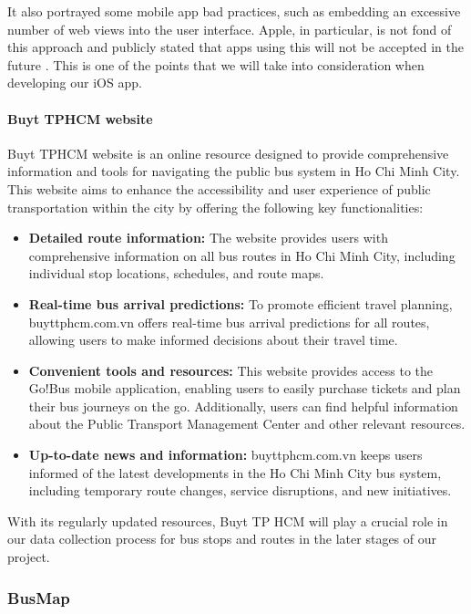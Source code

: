 It also portrayed some mobile app bad practices, such as embedding an excessive number of web views into the user interface. Apple, in particular, is not fond of this approach and publicly stated that apps using this will not be accepted in the future \cite{apple_webview}. This is one of the points that we will take into consideration when developing our iOS app.

\paragraph{Buyt TPHCM website}
Buyt TPHCM website is an online resource designed to provide comprehensive information and tools for navigating the public bus system in Ho Chi Minh City. This website aims to enhance the accessibility and user experience of public transportation within the city by offering the following key functionalities:

\begin{itemize}
    \item \textbf{Detailed route information:} The website provides users with comprehensive information on all bus routes in Ho Chi Minh City, including individual stop locations, schedules, and route maps.
    \item \textbf{Real-time bus arrival predictions:} To promote efficient travel planning, buyttphcm.com.vn offers real-time bus arrival predictions for all routes, allowing users to make informed decisions about their travel time.
    \item \textbf{Convenient tools and resources:} This website provides access to the Go!Bus mobile application, enabling users to easily purchase tickets and plan their bus journeys on the go. Additionally, users can find helpful information about the Public Transport Management Center and other relevant resources.
    \item \textbf{Up-to-date news and information:} buyttphcm.com.vn keeps users informed of the latest developments in the Ho Chi Minh City bus system, including temporary route changes, service disruptions, and new initiatives.
\end{itemize}

With its regularly updated resources, Buyt TP HCM will play a crucial role in our data collection process for bus stops and routes in the later stages of our project.

\subsubsection{BusMap}

